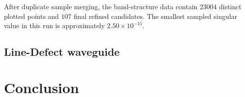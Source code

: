 \documentclass[11pt,fleqn]{article}
\theoremstyle{definition}
\theoremstyle{remark}
\begin{document}
After duplicate sample merging, the band-structure data contain \(23004\)
distinct plotted points and \(107\) final refined candidates. The smallest
sampled singular value in this run is approximately \(2.50\times10^{-15}\).

\subsection{Line-Defect waveguide}

\section{Conclusion}

\appendix
{}




\end{document}
